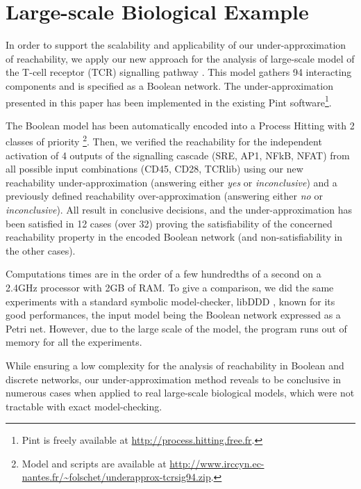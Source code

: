 
\section{Large-scale Biological Example}\label{sec:example}

In order to support the scalability and applicability of our under-approximation of reachability, we
apply our new approach for the analysis of large-scale model of the T-cell receptor (TCR)
signalling pathway \cite{tcrsig94}.
This model gathers 94 interacting components and is specified as a Boolean network.
The under-approximation presented in this paper has been implemented in the existing Pint
software\footnote{Pint is freely available at \url{http://process.hitting.free.fr}.}.

The Boolean model has been automatically encoded into a Process Hitting with 2 classes of priority%
\footnote{Model and scripts are available at
\url{http://www.irccyn.ec-nantes.fr/~folschet/underapprox-tcrsig94.zip}.}.
Then, we verified the reachability for the independent activation of 4 outputs of the signalling
cascade (SRE, AP1, NFkB, NFAT) from all possible input combinations (CD45, CD28, TCRlib) using our
new reachability under-approximation (answering either \emph{yes} or \emph{inconclusive}) and a 
previously defined reachability over-approximation \cite{PMR12-MSCS} (answering either \emph{no} or
\emph{inconclusive}).
All result in conclusive decisions, and the under-approximation has been satisfied in 12 cases (over
32) proving the satisfiability of the concerned reachability property in the encoded Boolean network
(and non-satisfiability in the other cases).

Computations times are in the order of a few hundredths of a second on a 2.4GHz processor with 2GB
of RAM.
To give a comparison, we did the same experiments with a standard symbolic model-checker, libDDD
\cite{libddd}, known for its good performances, the input model being the Boolean network expressed
as a Petri net.
However, due to the large scale of the model, the program runs out of memory for all the experiments.

While ensuring a low complexity for the analysis of reachability in Boolean and discrete networks, our
under-approximation method reveals to be conclusive in numerous cases when applied to real
large-scale biological models, which were not tractable with exact model-checking.


